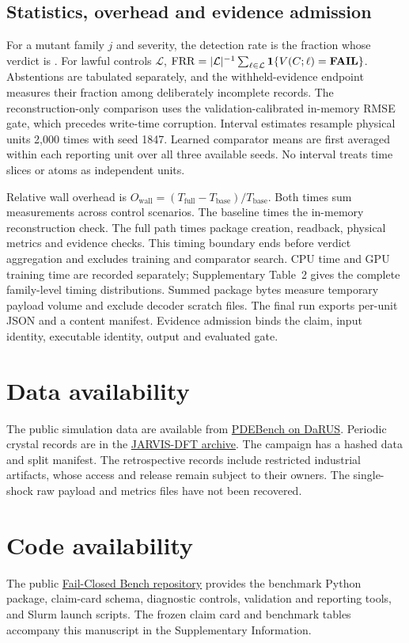 \documentclass[10pt,a4paper,twocolumn]{article}
\newcommand{\gate}[1]{\text{\textbf{#1}}}
\begin{document}
\subsection{Statistics, overhead and evidence admission}
For a mutant family $j$ and severity, the detection rate is the fraction whose verdict is \gate{FAIL}. For lawful controls $\mathcal L$, $\mathrm{FRR}=|\mathcal L|^{-1}\sum_{\ell\in\mathcal L}\mathbf{1}\{V(C;\ell)=\gate{FAIL}\}$. Abstentions are tabulated separately, and the withheld-evidence endpoint measures their fraction among deliberately incomplete records. The reconstruction-only comparison uses the validation-calibrated in-memory RMSE gate, which precedes write-time corruption. Interval estimates resample physical units 2,000 times with seed 1847. Learned comparator means are first averaged within each reporting unit over all three available seeds. No interval treats time slices or atoms as independent units.

Relative wall overhead is $O_{\mathrm{wall}}=(T_{\mathrm{full}}-T_{\mathrm{base}})/T_{\mathrm{base}}$. Both times sum measurements across control scenarios. The baseline times the in-memory reconstruction check. The full path times package creation, readback, physical metrics and evidence checks. This timing boundary ends before verdict aggregation and excludes training and comparator search. CPU time and GPU training time are recorded separately; Supplementary Table~2 gives the complete family-level timing distributions. Summed package bytes measure temporary payload volume and exclude decoder scratch files. The final run exports per-unit JSON and a content manifest. Evidence admission binds the claim, input identity, executable identity, output and evaluated gate.

\section*{Data availability}
The public simulation data are available from \href{https://darus.uni-stuttgart.de/api/access/datafile/164672}{PDEBench on DaRUS}. Periodic crystal records are in the \href{https://doi.org/10.6084/m9.figshare.6815699}{JARVIS-DFT archive}. The campaign has a hashed data and split manifest. The retrospective records include restricted industrial artifacts, whose access and release remain subject to their owners. The single-shock raw payload and metrics files have not been recovered.

\section*{Code availability}
The public \href{https://github.com/shodh-ai/fail_closed_bench}{Fail-Closed Bench repository} provides the benchmark Python package, claim-card schema, diagnostic controls, validation and reporting tools, and Slurm launch scripts. The frozen claim card and benchmark tables accompany this manuscript in the Supplementary Information.
\end{document}
